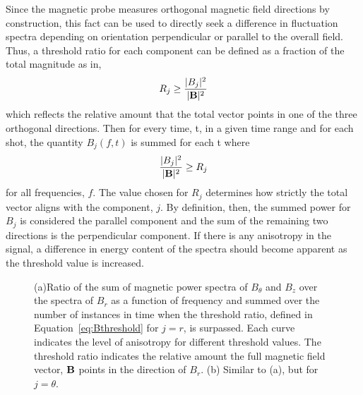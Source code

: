 \documentclass[manuscript]{aastex}
\begin{document}
Since the magnetic probe measures orthogonal magnetic field directions by construction, this fact can be used to directly seek a difference in fluctuation spectra depending on orientation perpendicular or parallel to the overall field. Thus, a threshold ratio for each component can be defined as a fraction of the total magnitude as in,
\begin{equation}
R_{j} \geq \frac{|B_{j}|^{2}}{|{\bf B}|^{2}}
\label{eq:Bthreshold}
\end{equation}
which reflects the relative amount that the total vector points in one of the three orthogonal directions. Then for every time, t, in a given time range and for each shot, the quantity $B_{j}(f,t)$ is summed for each t where
\begin{equation}
\frac{|B_{j}|^{2}}{|{\bf B}|^{2}} \geq R_{j}
\label{eq:Bcondition}
\end{equation}
for all frequencies, $f$. The value chosen for $R_{j}$ determines how strictly the total vector aligns with the component, $j$. By definition, then, the summed power for $B_{j}$ is considered the parallel component and the sum of the remaining two directions is the perpendicular component. If there is any anisotropy in the signal, a difference in energy content of the spectra should become apparent as the threshold value is increased.

\begin{figure}
\caption{\label{fig:thresholdmethod} (a)Ratio of the sum of magnetic power spectra of $B_{\theta}$ and $B_{z}$ over the spectra of $B_{r}$ as a function of frequency and summed over the number of instances in time when the threshold ratio, defined in Equation~\ref{eq:Bthreshold} for $j=r$, is surpassed. Each curve indicates the level of anisotropy for different threshold values. The threshold ratio indicates the relative amount the full magnetic field vector, ${\bf B}$ points in the direction of $B_{r}$. (b) Similar to (a), but for $j=\theta$.}
\end{figure}
\end{document}

